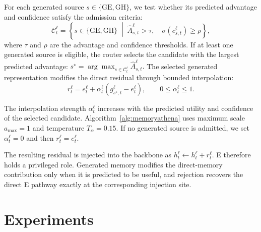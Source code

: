 \documentclass{article}
\begin{document}
For each generated source
$s \in \{\mathrm{GE},\mathrm{GH}\}$,
we test whether its predicted advantage and confidence satisfy the admission
criteria:
\begin{equation}
\mathcal{C}_t^\ell
=
\left\{
s \in \{\mathrm{GE},\mathrm{GH}\}
\; \middle| \;
\widehat{A}_{s,t}^{\ell} > \tau,
\quad
\sigma\!\left(c_{s,t}^{\ell}\right) \geq \rho
\right\},
\label{eq:eligible_set}
\end{equation}
where $\tau$ and $\rho$ are the advantage and confidence thresholds.
%
If at least one generated source is eligible, the router selects the candidate
with the largest predicted advantage:
$
s^\star
=
\arg\max_{s \in \mathcal{C}_t^\ell}
\widehat{A}_{s,t}^{\ell}.
$
%
The selected generated representation modifies the direct residual through
bounded interpolation:
\begin{equation}
r_t^\ell
=
e_t^\ell
+
\alpha_t^\ell
\left(
g_{s^\star,t}^\ell - e_t^\ell
\right),
\qquad
0 \leq \alpha_t^\ell \leq 1.
\label{eq:anchored_interpolation}
\end{equation}

The interpolation strength $\alpha_t^\ell$ increases with the predicted utility and confidence of the selected candidate. Algorithm~\ref{alg:memoryathena} uses maximum scale $a_{\max}=1$ and temperature $T_\alpha=0.15$.
If no generated source is admitted, we set $\alpha_t^\ell = 0$ and then
$r_t^\ell = e_t^\ell$.

The resulting residual is injected into the backbone as
$h_t^\ell
\leftarrow
h_t^\ell + r_t^\ell.$
%
E therefore holds a privileged role. Generated memory modifies the
direct-memory contribution only when it is predicted to be useful, and
rejection recovers the direct E pathway exactly at the corresponding injection
site.


\section{Experiments}
\end{document}
